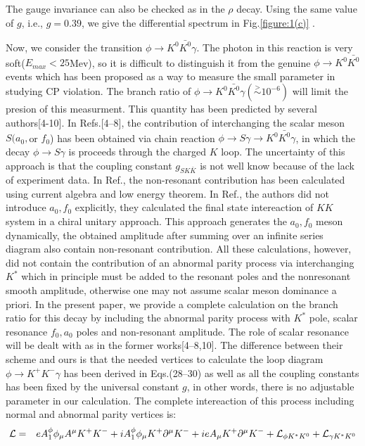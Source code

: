 The gauge invariance can also be checked as in the $\rho$ decay. Using the
same value of $g$, i.e., $g=0.39$, we give the differential spectrum
in Fig.\ref{figure:1(c)} .
   
Now, we consider the transition $\phi \rightarrow K^0\bar{K^0}\gamma$. The
photon in this reaction is very soft($E_{max}<25$Mev), so it is difficult
to
distinguish it from the genuine $\phi \rightarrow K^0\bar{K^0}$ events
which has been proposed as a way to measure the small parameter in
studying CP violation. The branch ratio of $\phi \rightarrow
K^0\bar{K^0}\gamma(\stackrel{>}{\sim} 10^{-6})$ will limit the presion of
this
measurment. This quantity has been predicted by several authors[4-10]. 
In Refs.[4--8], the contribution of interchanging the scalar meson
$S(a_0,$or $f_0$) has been obtained via
chain reaction $\phi \rightarrow S\gamma \rightarrow K^0\bar{K^0}\gamma$,
in
which the decay $\phi \rightarrow S\gamma$ is proceeds through the charged
$K$ loop. The uncertainty of this approach is that the coupling constant
$g_{SK\bar K}$ is not well know because of the lack of experiment data. 
In Ref.\cite{b4}, the non-resonant contribution has been calculated using
current algebra and low energy theorem. In Ref.\cite{b6}, the authors
did not
introduce $a_0,f_0$ explicitly, they calculated the final state
intereaction of $KK$ system in a chiral unitary approach. This approach
generates the $a_0,f_0$ meson dynamically, the obtained amplitude after
summing over an infinite series diagram also contain non-resonant
contribution. All these calculations, however, did not contain the
contribution of an abnormal parity
process via interchanging $K^*$ which in principle must be added to the 
resonant poles and the nonresonant smooth amplitude, otherwise one may
not assume scalar meson dominance a priori. In the present paper, we
provide a complete calculation on the branch ratio for this decay by
including the abnormal parity process with $K^*$ pole, scalar resonance
$f_0, a_0$ poles and non-resonant amplitude. The role of scalar resonance
will be dealt with as in the former works[4--8,10]. The difference between
their scheme and ours is that the needed vertices to calculate the loop
diagram $\phi \to K^+K^-\gamma$ has been derived in Eqs.(28--30) as well 
as all the coupling constants has been fixed by the universal constant
$g$, in other words, there is no adjustable parameter in our calculation.  
The complete intereaction of this process including normal and
abnormal parity vertices is:
\begin{eqnarray}
{\cal L}&=&eA_1^\phi\phi_\mu A^\mu K^+K^-
+i A_1^\phi\phi_\mu K^+\partial^\mu K^-
+ieA_\mu K^+\partial^\mu K^- +{\cal L}_{\phi K^* K^0}+
{\cal L}_{\gamma K^* K^0}
\end{eqnarray}
